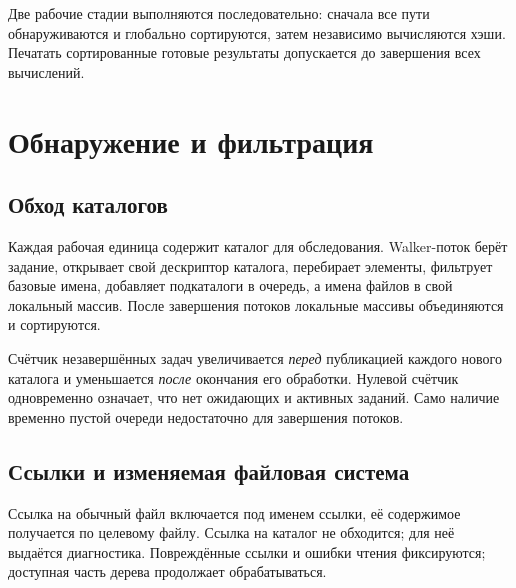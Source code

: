 \documentclass[12pt,a4paper]{article}
\begin{document}
\begin{center}
\end{center}

Две рабочие стадии выполняются последовательно: сначала все пути обнаруживаются
и глобально сортируются, затем независимо вычисляются хэши. Печатать
сортированные готовые результаты допускается до завершения всех вычислений.

\section{Обнаружение и фильтрация}

\subsection{Обход каталогов}

Каждая рабочая единица содержит каталог для обследования. Walker-поток берёт
задание, открывает свой дескриптор каталога, перебирает элементы, фильтрует
базовые имена, добавляет подкаталоги в очередь, а имена файлов в свой локальный
массив. После завершения потоков локальные массивы объединяются и сортируются.

Счётчик незавершённых задач увеличивается \emph{перед} публикацией
каждого нового каталога и уменьшается \emph{после} окончания его обработки.
Нулевой счётчик одновременно означает, что нет ожидающих и активных заданий.
Само наличие временно пустой очереди недостаточно для завершения потоков.

\subsection{Ссылки и изменяемая файловая система}

Ссылка на обычный файл включается под именем ссылки, её содержимое получается
по целевому файлу. Ссылка на каталог не обходится; для неё выдаётся
диагностика. Повреждённые ссылки и ошибки чтения фиксируются; доступная часть
дерева продолжает обрабатываться.
\end{document}
